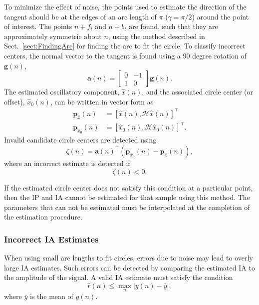 \documentclass[11pt,draftcls,onecolumn]{IEEEtran}
\begin{document}
To minimize the effect of noise, the points used to estimate the direction of the tangent should be at the edges of an arc length of $\pi$ ($\gamma = \pi/2$) around the point of interest. The points $n+f_t$ and $n+b_t$ are found, such that they are approximately symmetric about $n$, using the method described in Sect.~\ref{sect:FindingArc} for finding the arc to fit the circle. To classify incorrect centers, the normal vector to the tangent is found using a $90$ degree rotation of $\mathbf{g}(n)$,
\begin{equation}
	\mathbf{a}\left(n\right) = \left[\begin{array}{cc}
	0 & -1 \\
	1 & 0\end{array}\right]\mathbf{g}(n).
\end{equation}
The estimated oscillatory component, $\hat{x}(n)$, and the associated circle center (or offset), $\hat{x}_0(n)$, can be written in vector form as
\begin{align}
	\mathbf{p}_{\hat{x}}(n) &= \left[\hat{x}\left(n\right),\mathcal{H}\hat{x}\left(n\right)\right]^{\top} \\ 
	\mathbf{p}_{\hat{x}_0}\left(n\right) &= \left[\hat{x}_0\left(n\right), \mathcal{H}\hat{x}_0\left(n\right)\right]^{\top}. 
\end{align}
Invalid candidate circle centers are detected using 
\begin{equation}
    \zeta(n) = \mathbf{a}\left( n\right)^{\top}\left( \mathbf{p}_{\hat{x}_0}\left( n \right) - \mathbf{p}_{\hat{x}}\left( n\right) \right),
\end{equation}
where an incorrect estimate is detected if
\begin{equation}\label{eq:IncorrectSideClassifier}
    \zeta(n) < 0.
\end{equation} 

If the estimated circle center does not satisfy this condition at a particular point, then the IP and IA cannot be estimated for that sample using this method. The parameters that can not be estimated must be interpolated at the completion of the estimation procedure. 

\subsubsection{Incorrect IA Estimates}
When using small arc lengths to fit circles, errors due to noise may lead to overly large IA estimates. Such errors can be detected by comparing the estimated IA to the amplitude of the signal. A valid IA estimate must satisfy the condition
\begin{equation}\label{eq:bound_on_IA_estimate}
	\hat{r}(n) \leq \max_n\left| y(n) - \bar{y}\right|,
\end{equation}
where $\bar{y}$ is the mean of $y(n)$.
\end{document}
